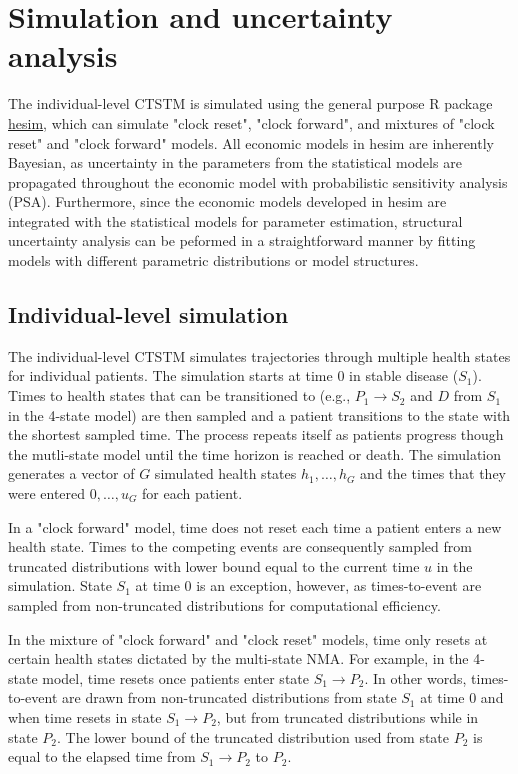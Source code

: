 \documentclass[11pt,final,fleqn]{article}\usepackage[]{graphicx}\usepackage[]{color}
\theoremstyle{plain}
\newcommand\R{{\textsf{R}}}
\newcommand{\pkg}[1]{{\fontseries{b}\selectfont #1}}
\begin{document}
\section{Simulation and uncertainty analysis}\label{sec:uncertainty-analysis}
The individual-level CTSTM is simulated using the general purpose \R{} package \href{https://hesim-dev.github.io/hesim/}{\pkg{hesim}}, which can simulate "clock reset", "clock forward", and mixtures of "clock reset" and "clock forward" models. All economic models in \pkg{hesim} are inherently Bayesian, as uncertainty in the parameters from the statistical models are propagated throughout the economic model with probabilistic sensitivity analysis (PSA).   Furthermore, since the economic models developed in \pkg{hesim} are integrated with the statistical models for parameter estimation, structural uncertainty analysis can be peformed in a straightforward manner by fitting models with different parametric distributions or model structures. 

\subsection{Individual-level simulation}\label{subsec:indivsim}
The individual-level CTSTM simulates trajectories through multiple health states for individual patients. The simulation starts at time $0$ in stable disease ($S_1$). Times to health states that can be transitioned to (e.g., $P_1 \rightarrow S_2$ and $D$ from $S_1$ in the 4-state model) are then sampled and a patient transitions to the state with the shortest sampled time. The process repeats itself as patients progress though the mutli-state model until the time horizon is reached or death. The simulation generates a vector of $G$ simulated health states $h_1,\ldots,h_G$ and the times that they were entered $0, \ldots, u_G$ for each patient.  

In a "clock forward" model, time does not reset each time a patient enters a new health state. Times to the competing events are consequently sampled from truncated distributions with lower bound equal to the current time $u$ in the simulation. State $S_1$ at time $0$ is an exception, however, as times-to-event are sampled from non-truncated distributions for computational efficiency. 

In the mixture of "clock forward" and "clock reset" models, time only resets at certain health states dictated by the multi-state NMA. For example, in the 4-state model, time resets once patients enter state $S_1 \rightarrow P_2$. In other words, times-to-event are drawn from non-truncated distributions from state $S_1$ at time $0$ and when time resets in state $S_1 \rightarrow P_2$, but from truncated distributions while in state $P_2$. The lower bound of the truncated distribution used from state $P_2$ is equal to the elapsed time from $S_1 \rightarrow P_2$ to $P_2$.  
\end{document}
